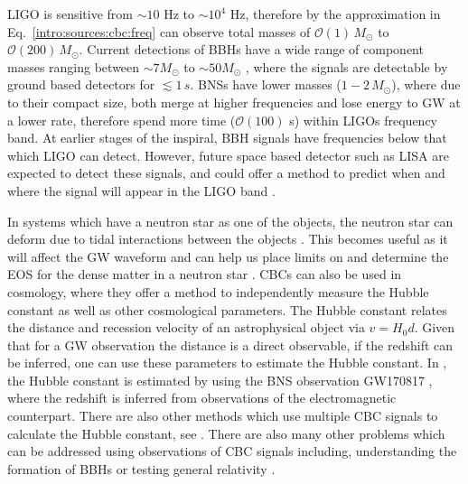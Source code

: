 \gls{LIGO} is sensitive from $\sim 10$ Hz to $\sim
10^4$ Hz, therefore by the approximation in Eq.~\ref{intro:sources:cbc:freq} can observe total masses of $\mathcal{O}(1)\,M_{\odot}$ to $\mathcal{O}(200)\, M_{\odot}$. Current detections of \glspl{BBH} have a wide range of component masses ranging between $\sim 7M_{\odot}$ to $\sim 50M_{\odot}$
\citep{ligoscientificcollaborationandvirgocollaboration2019GWTC1GravitationalWave}, where the signals are detectable by ground based detectors for $\lesssim 1\,s$.  \glspl{BNS} have lower masses ($1-2\,M_{\odot}$), where due to their compact size, both merge at higher frequencies and lose energy to \gls{GW} at a lower rate, therefore spend more time ($\mathcal{O}(100)$ s) within \glspl{LIGO} frequency band.  
At earlier stages of the inspiral, \gls{BBH} signals have frequencies below that which \gls{LIGO} can detect.
However, future space based detector such as \gls{LISA} \citep{danzmann1996LISALaser} are expected to detect these signals, and could offer a method to predict when and where the signal will appear in the \gls{LIGO} band \citep{sesana2016ProspectsMultiband}. 

In systems which have a neutron star as one of the objects, the neutron star can deform due to tidal interactions between the objects
\citep{flanagan2008ConstrainingNeutronstar}.  This becomes useful as it will
affect the \gls{GW} waveform and can help us place limits on and determine the
\gls{EOS} for the dense matter in a neutron star
\citep{harry2018ObservingMeasuring}.
\glspl{CBC} can also be used in cosmology, where they offer a method to independently measure the Hubble constant as well as other cosmological parameters.
The Hubble constant relates the distance and recession velocity of an astrophysical object via $v = H_0 d$.  Given that for a \gls{GW} observation the distance is a direct observable, if the redshift can be inferred, one can use these parameters to estimate the Hubble constant. 
In \cite{theligoscientificcollaborationandthevirgocollaboration2017GravitationalwaveStandard}, the Hubble constant is estimated by using the \gls{BNS} observation GW170817 \citep{abbott2017GW170817Observation}, where the redshift is inferred from observations of the electromagnetic counterpart.  There are also other methods which use multiple \gls{CBC} signals to calculate the Hubble constant, see \citep{delpozzo2012InferenceCosmological}.
There are also many other problems which can be addressed using observations of \gls{CBC} signals including, understanding the formation of \glspl{BBH} \citep{zevin2017ConstrainingFormation,mandel2018MergingStellarmass} or testing general relativity \citep{theligoscientificcollaborationandthevirgocollaboration2019TestsGeneral}. 



